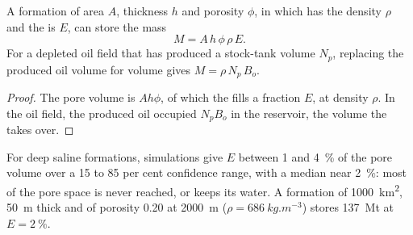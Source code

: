 \begin{omfigure}
\begin{minipage}[b]{0.49\linewidth}
\end{minipage}
\par{}
\end{omfigure}

\begin{proposition}\label{prop:b2:energy-geology:capacity}
A formation of area $A$, thickness $h$ and porosity $\phi$, in which  has the density $\rho$
and the  is $E$, can store the mass
\begin{equation}
M = A\,h\,\phi\,\rho\,E .
\label{eq:b2:energy-geology:capacity}
\end{equation}
For a depleted oil field that has produced a stock-tank volume $N_p$, replacing the produced oil
volume for volume gives $M = \rho\,N_p\,B_o$.
\end{proposition}

\begin{proof}
The pore volume is $Ah\phi$, of which the  fills a fraction $E$, at density $\rho$. In the
oil field, the produced oil occupied $N_pB_o$ in the reservoir, the volume the  takes over.
\end{proof}

For deep saline formations, simulations give $E$ between 1 and \qty{4}{\percent} of the pore volume
over a 15 to 85 per cent confidence range, with a median near \qty{2}{\percent}: most of the pore
space is never reached, or keeps its water. A formation of \qty{1000}{km^2}, \qty{50}{m} thick and of
porosity 0.20 at \qty{2000}{m} ($\rho = \qty{686}{kg.m^{-3}}$) stores \qty{137}{Mt} at $E =
\qty{2}{\percent}$.

